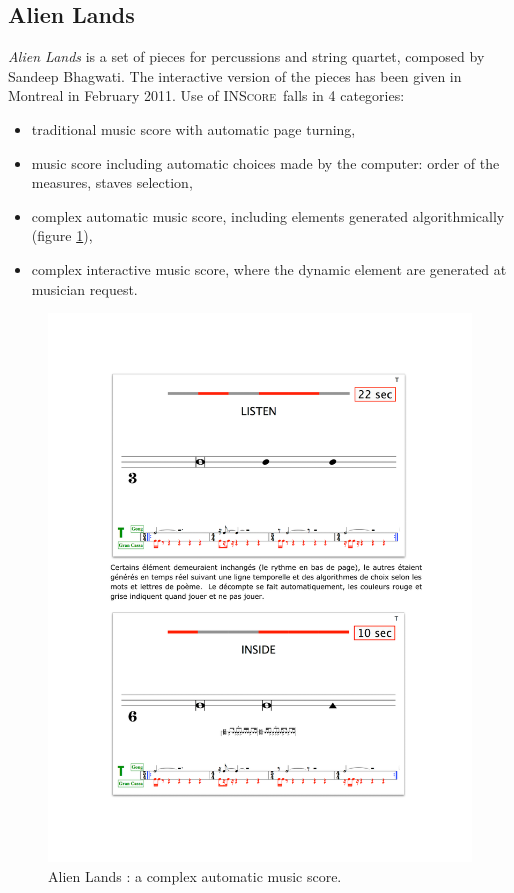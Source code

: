 \documentclass{article}
\newcommand{\inscore}		{\textsc{\small INScore}}
\begin{document}
\subsection{Alien Lands}

\textit{Alien Lands} is a set of pieces for percussions and string quartet, composed by Sandeep Bhagwati. 
The interactive version of the pieces has been given in Montreal in February 2011.
Use of \inscore\ falls in 4 categories:
\begin{itemize}
\item traditional music score with automatic page turning,
\item music score including automatic choices made by the computer: order of the measures, staves selection,
\item complex automatic music score, including elements generated algorithmically (figure \ref{fig:al}),
\item complex interactive music score, where the dynamic element are generated at musician request.
\end{itemize}

\begin{figure}[htbp]
\centerline{
	\includegraphics[width=0.94\columnwidth]{imgs/alienscore}}
\caption{Alien Lands : a complex automatic music score.}
\label{fig:al}
\end{figure}
\end{document}
